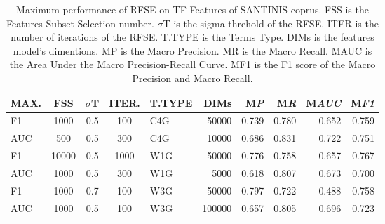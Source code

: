 \documentclass[runningheads]{llncs}
\begin{document}
\begin{table}
\center
\begin{tabular}{|l|ccc|lr|rrrr|}
\hline
MAX. & FSS & $\sigma$T & ITER. & T.TYPE & DIMs & M\emph{P} & M\emph{R} & M\emph{AUC} & M\emph{F1} \\
\hline
F1 & 1000 & 0.5 & 100 & C4G & 50000 & 0.739 & 0.780 & 0.652 & 0.759 \\
AUC & 500 & 0.5 & 300 & C4G & 10000 & 0.686 & 0.831 & 0.722 & 0.751 \\
F1 & 10000 & 0.5 & 1000 & W1G & 50000 & 0.776 & 0.758 & 0.657 & 0.767 \\
AUC & 1000 & 0.5 & 300 & W1G & 5000 & 0.618 & 0.807 & 0.673 & 0.700 \\
F1 & 1000 & 0.7 & 100 & W3G & 50000 & 0.797 & 0.722 & 0.488 & 0.758 \\
AUC & 1000 & 0.5 & 100 & W3G & 100000 & 0.657 & 0.805 & 0.696 & 0.723 \\
\hline
\end{tabular}
\caption {Maximum performance of RFSE on TF Features of SANTINIS coprus. FSS is the Features Subset Selection number. $\sigma$T is the sigma threhold of the RFSE. ITER is the number of iterations of the RFSE. T.TYPE is the Terms Type. DIMs is the features model's dimentions. MP is the Macro Precision. MR is the Macro Recall. MAUC is the Area Under the Macro Precision-Recall Curve. MF1 is the F1 score of the Macro Precision and Macro Recall.}
\label{tbl:RFSE_TF}
\vspace{-15mm}
\end{table}
\end{document}
